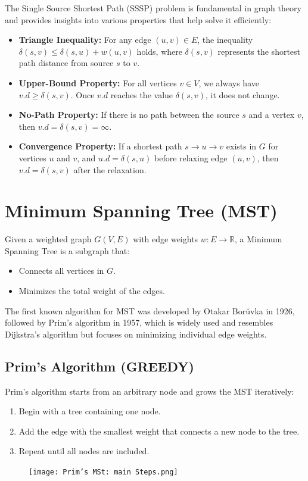 The Single Source Shortest Path (SSSP) problem is fundamental in graph theory and provides insights into various properties that help solve it efficiently:

\begin{itemize}
    \item \textbf{Triangle Inequality:} For any edge $(u,v) \in E$, the inequality \( \delta(s,v) \leq \delta(s,u) + w(u,v) \) holds, where \( \delta(s,v) \) represents the shortest path distance from source \( s \) to \( v \).
    
    \item \textbf{Upper-Bound Property:} For all vertices \( v \in V \), we always have \( v.d \geq \delta(s,v) \). Once \( v.d \) reaches the value \( \delta(s,v) \), it does not change.

    \item \textbf{No-Path Property:} If there is no path between the source \( s \) and a vertex \( v \), then \( v.d = \delta(s,v) = \infty \).

    \item \textbf{Convergence Property:} If a shortest path \( s \to u \to v \) exists in \( G \) for vertices \( u \) and \( v \), and \( u.d = \delta(s,u) \) before relaxing edge \( (u,v) \), then \( v.d = \delta(s,v) \) after the relaxation.
\end{itemize}

\section{Minimum Spanning Tree (MST)}

Given a weighted graph \( G(V, E) \) with edge weights \( w: E \to \mathbb{R} \), a Minimum Spanning Tree is a subgraph that:
\begin{itemize}
    \item Connects all vertices in \( G \).
    \item Minimizes the total weight of the edges.
\end{itemize}

The first known algorithm for MST was developed by Otakar Bor\u{u}vka in 1926, followed by Prim's algorithm in 1957, which is widely used and resembles Dijkstra's algorithm but focuses on minimizing individual edge weights.

\subsection{Prim's Algorithm (GREEDY)}
Prim's algorithm starts from an arbitrary node and grows the MST iteratively:
\begin{enumerate}
    \item Begin with a tree containing one node.
    \item Add the edge with the smallest weight that connects a new node to the tree.
    \item Repeat until all nodes are included.
\end{enumerate}
\begin{figure}[H]
    \centering
    \texttt{[image: Prim's MSt: main Steps.png]}

\end{figure}

